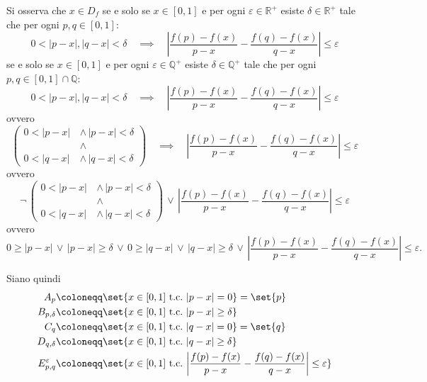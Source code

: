 \documentclass{article}
\DeclareMathOperator{\tc}{t.c.}
\newcommand{\1}{\mathds{1}}
\newcommand{\R}{\mathds{R}}
\newcommand{\Q}{\mathds{Q}}
\begin{document}
Si osserva che \(x \in D_{f}\) se e solo se \(x \in [0,1]\) e per ogni \(\varepsilon \in \R^{+}\) esiste \(\delta \in \R^{ +}\) tale che per ogni \(p, q \in [0,1]\):
\begin{equation*}
0<|p-x|,|q-x|< \delta
\quad\implies\quad
\left|\frac{f(p)-f(x)}{p-x}-\frac{f(q)-f(x)}{q-x}\right|\le\varepsilon
\end{equation*}
se e solo se \(x \in [0,1]\) e per ogni \(\varepsilon \in \Q^{+}\) esiste \(\delta \in \Q^{ +}\) tale che per ogni \(p, q \in [0,1]\cap \Q\):
\begin{equation*}
0<|p-x|,|q-x|< \delta
\quad\implies\quad
\left|\frac{f(p)-f(x)}{p-x}-\frac{f(q)-f(x)}{q-x}\right|\le\varepsilon
\end{equation*}
ovvero
\begin{equation*}
\left(
\begin{aligned}
0<|p-x| \,&\mathord{\wedge}\,|p-x|< \delta\\
&\mathord{\wedge}\\
0<|q-x| \,&\mathord{\wedge}\,|q-x|<\delta
\end{aligned}
\right)
\quad\implies\quad
\left|\frac{f(p)-f(x)}{p-x}-\frac{f(q)-f(x)}{q-x}\right|\le\varepsilon
\end{equation*}
ovvero
\begin{equation*}
\lnot\,\left(
\begin{aligned}
0<|p-x| \,&\mathord{\wedge}\,|p-x|< \delta\\
&\mathord{\wedge}\\
0<|q-x| \,&\mathord{\wedge}\,|q-x|<\delta
\end{aligned}
\right)
\,\lor\,
\left|\frac{f(p)-f(x)}{p-x}-\frac{f(q)-f(x)}{q-x}\right|\le\varepsilon
\end{equation*}
ovvero
\begin{equation*}
0\ge |p-x| \,\lor\, |p-x|\ge \delta \,\lor\, 0\ge|q-x| \,\lor\, |q-x|\ge \delta
\,\lor\, \left|\frac{f(p)-f(x)}{p-x}-\frac{f(q)-f(x)}{q-x}\right|\le\varepsilon.
\end{equation*}

Siano quindi
\begin{align*}
A_{p} &\coloneqq \set{x \in [0,1]\,\tc\, |p-x|=0} = \set{p}\\
B_{p,\delta} &\coloneqq \set{x \in [0,1]\,\tc\, |p-x|\ge \delta}\\
C_{q} &\coloneqq \set{x \in [0,1]\,\tc\, |q-x|=0} = \set{q}\\
D_{q,\delta} &\coloneqq \set{x \in [0,1]\,\tc\, |q-x|\ge \delta}\\
E_{p,q}^{\varepsilon} &\coloneqq \set{x \in [0,1]\,\tc\,\left|\frac{f(p)-f(x)}{p-x}-\frac{f(q)-f(x)}{q-x}\right|\le\varepsilon}
\end{align*}
\end{document}
